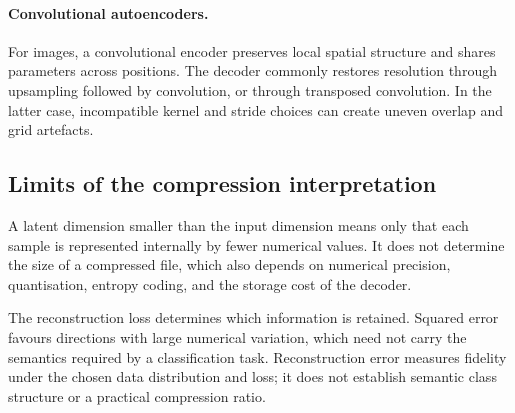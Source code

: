 \paragraph{Convolutional autoencoders.}
For images, a convolutional encoder preserves local spatial structure and shares parameters across positions. The decoder commonly restores resolution through upsampling followed by convolution, or through transposed convolution. In the latter case, incompatible kernel and stride choices can create uneven overlap and grid artefacts.

\subsection{Limits of the compression interpretation}

A latent dimension smaller than the input dimension means only that each sample is represented internally by fewer numerical values. It does not determine the size of a compressed file, which also depends on numerical precision, quantisation, entropy coding, and the storage cost of the decoder.

The reconstruction loss determines which information is retained. Squared error favours directions with large numerical variation, which need not carry the semantics required by a classification task. Reconstruction error measures fidelity under the chosen data distribution and loss; it does not establish semantic class structure or a practical compression ratio.

